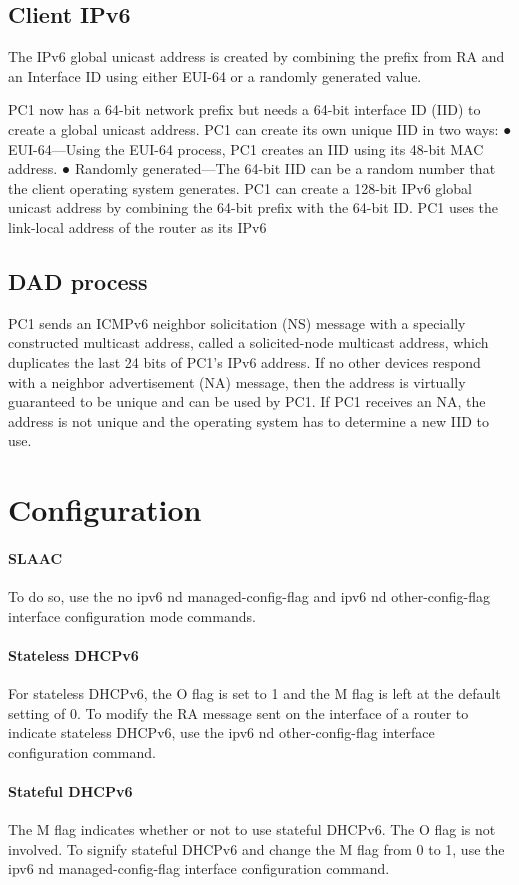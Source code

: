 \subsection{Client IPv6}

The
IPv6 global unicast address is created by combining the prefix from RA and an
Interface ID using either EUI-64 or a randomly generated value.

PC1 now has a 64-bit network prefix but needs a 64-bit interface ID
(IID) to create a global unicast address.
PC1 can create its own unique IID in two ways:
● EUI-64—Using the EUI-64 process, PC1 creates an IID using its 48-bit MAC
address.
● Randomly generated—The 64-bit IID can be a random number that the client
operating system generates.
PC1 can create a 128-bit IPv6 global unicast address by combining the 64-bit
prefix with the 64-bit ID. PC1 uses the link-local address of the router as its IPv6

\subsection{DAD process}

PC1 sends an ICMPv6 neighbor
solicitation (NS) message with a specially constructed multicast address, called
a solicited-node multicast address, which duplicates the last 24 bits of PC1’s
IPv6 address. If no other devices respond with a neighbor advertisement (NA)
message, then the address is virtually guaranteed to be unique and can be used
by PC1. If PC1 receives an NA, the address is not unique and the operating system has to determine a new IID to use.

\section{Configuration}

\paragraph{SLAAC}

To do so, use the no ipv6 nd
managed-config-flag and ipv6 nd other-config-flag interface configuration mode
commands.

\paragraph{Stateless DHCPv6}For stateless DHCPv6, the O flag is set to 1 and the M flag is left at the default
setting of 0. To modify the RA message sent on the interface of a router to indicate stateless
DHCPv6, use the ipv6 nd other-config-flag interface configuration command.

\paragraph{Stateful DHCPv6}The M flag indicates whether or not to use stateful DHCPv6. The O flag is not involved.
To signify stateful DHCPv6 and change the M flag from 0 to 1, use the ipv6 nd
managed-config-flag interface configuration command.